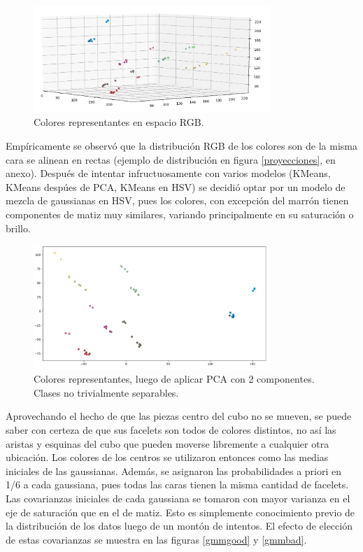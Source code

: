 \begin{figure}[h!]
	\centering
	\includegraphics[width=0.8\textwidth]{figures/rgb_3d}
	\caption{Colores representantes en espacio RGB.}
	\label{rgb3d}
\end{figure}


Empíricamente se observó que la distribución RGB de los colores son de la misma cara se alinean en rectas (ejemplo de distribución en figura \ref{proyecciones}, en anexo). Después de intentar infructuosamente con varios modelos (KMeans, KMeans despúes de PCA, KMeans en HSV) se decidió optar por un modelo de mezcla de gaussianas en HSV, pues los colores, con excepción del marrón tienen componentes de matiz muy similares, variando principalmente en su saturación o brillo.

\begin{figure}[h!]
	\centering
	\includegraphics[width=0.8\textwidth]{figures/rgb_pca}
	\caption[Colores representantes, luego de aplicar PCA con 2 componentes]{Colores representantes, luego de aplicar PCA con 2 componentes. Clases no trivialmente separables.}
	\label{rgb3d}
\end{figure}

Aprovechando el hecho de que las piezas centro del cubo no se mueven, se puede saber con certeza de que sus facelets son todos de colores distintos, no así las aristas y esquinas del cubo que pueden moverse libremente a cualquier otra ubicación. Los colores de los centros se utilizaron entonces como las medias iniciales de las gaussianas. Además, se asignaron las probabilidades a priori en 1/6 a cada gaussiana, pues todas las caras tienen la misma cantidad de facelets. Las covarianzas iniciales de cada gaussiana se tomaron con mayor varianza en el eje de saturación que en el de matiz. Esto es simplemente conocimiento previo de la distribución de los datos luego de un montón de intentos. El efecto de elección de estas covarianzas se muestra en las figuras \ref{gmmgood} y \ref{gmmbad}.

